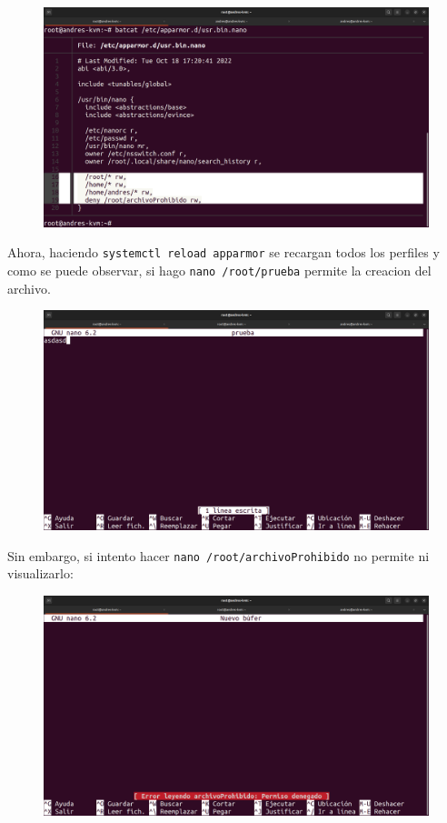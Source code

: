 \documentclass{article}
\begin{document}
\begin{figure}[H]
    \centering
    \includegraphics[width=\textwidth]{imagenes/Captura desde 2022-10-18 17-30-04.png}
\end{figure}

Ahora, haciendo \verb|systemctl reload apparmor| se recargan todos los perfiles y como se puede observar, si hago \verb|nano /root/prueba| permite la creacion del archivo.

\begin{figure}[H]
    \centering
    \includegraphics[width=\textwidth]{imagenes/Captura desde 2022-10-18 17-26-43.png}
\end{figure}

\bigskip

Sin embargo, si intento hacer \verb|nano /root/archivoProhibido| no permite ni visualizarlo:

\begin{figure}[H]
    \centering
    \includegraphics[width=\textwidth]{imagenes/Captura desde 2022-10-18 17-26-52.png}
\end{figure}
\end{document}
